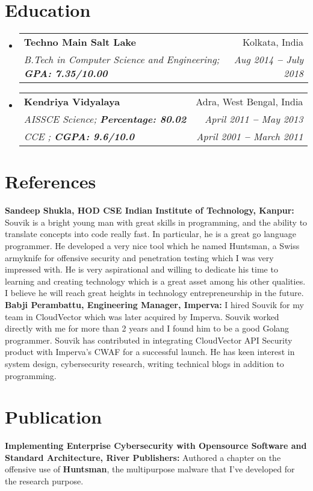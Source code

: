 \documentclass[letterpaper,11pt]{article}
\makeatletter
\newcommand{\resumeSubheading}[4]{
  \vspace{-2pt}\item
    \begin{tabular*}{0.97\textwidth}[t]{l@{\extracolsep{\fill}}r}
      \textbf{#1} & #2 \\
      \textit{\small#3} & \textit{\small #4} \\
    \end{tabular*}\vspace{-7pt}
}
\newcommand{\resumeEducationHeading}[6]{
  \vspace{-2pt}\item
    \begin{tabular*}{0.97\textwidth}[t]{l@{\extracolsep{\fill}}r}
      \textbf{#1} & #2 \\
      \textit{\small#3} & \textit{\small #4} \\
      \textit{\small#5} & \textit{\small #6} \\
    \end{tabular*}\vspace{-5pt}
}
\newcommand{\resumeSubHeadingListStart}{\begin{itemize}[leftmargin=0.15in, label={}]}
\newcommand{\resumeSubHeadingListEnd}{\end{itemize}}
\makeatother
\begin{document}

\section{Education}
  \vspace{3pt}
  \resumeSubHeadingListStart
    
    \resumeSubheading
      {Techno Main Salt Lake
      }{Kolkata, India}
      {B.Tech in Computer Science and Engineering;   \textbf{GPA: 7.35/10.00}}{Aug 2014 \textbf{--} July 2018}
    
    \resumeEducationHeading
      {Kendriya Vidyalaya 
      }{Adra, West Bengal, India}
      {AISSCE Science;   \textbf{Percentage: 80.02}}{April 2011 \textbf{--} May 2013}
      {CCE ;   \textbf{CGPA: 9.6/10.0}}{April 2001 \textbf{--} March 2011}
    
  \resumeSubHeadingListEnd


\section{References}
  \vspace{2pt}
  \resumeSubHeadingListStart
    \small{\item{
        \textbf{Sandeep Shukla, HOD CSE Indian Institute of Technology, Kanpur:}{ Souvik is a bright young man with great skills in programming, and the ability to translate concepts into code really fast. In particular, he is a great go language programmer. He developed a very nice tool which he named Huntsman, a Swiss armyknife for offensive security and penetration testing which I was very impressed with. He is very aspirational and willing to dedicate his time to learning and creating technology which is a great asset among his other qualities. I believe he will reach great heights in technology entrepreneurship in the future.} \\ \vspace{3pt}
       \textbf{Babji Perambattu, Engineering Manager, Imperva: }{I hired Souvik for my team in CloudVector which was later acquired by Imperva. Souvik worked directly with me for more than 2 years and I found him to be a good Golang programmer. Souvik has contributed in integrating CloudVector API Security product with Imperva's CWAF for a successful launch. He has keen interest in system design, cybersecurity research, writing technical blogs in addition to programming.} 
    }}
  \resumeSubHeadingListEnd

  \section{Publication}
  \vspace{2pt}
  \resumeSubHeadingListStart
	\small{\item{
			\textbf{Implementing Enterprise Cybersecurity with Opensource Software and Standard Architecture, River Publishers: }{Authored a chapter on the offensive use of \textbf{Huntsman}, the multipurpose malware that I've developed for the research purpose.}
		}}
  \resumeSubHeadingListEnd
\end{document}
